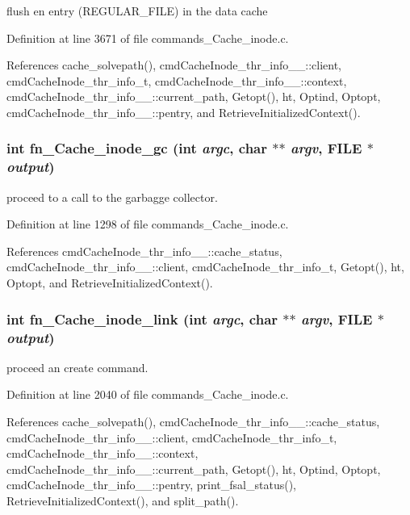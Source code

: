 flush en entry (REGULAR\_\-FILE) in the data cache 

Definition at line 3671 of file commands\_\-Cache\_\-inode.c.

References cache\_\-solvepath(), cmd\-Cache\-Inode\_\-thr\_\-info\_\-\_\-::client, cmd\-Cache\-Inode\_\-thr\_\-info\_\-t, cmd\-Cache\-Inode\_\-thr\_\-info\_\-\_\-::context, cmd\-Cache\-Inode\_\-thr\_\-info\_\-\_\-::current\_\-path, Getopt(), ht, Optind, Optopt, cmd\-Cache\-Inode\_\-thr\_\-info\_\-\_\-::pentry, and Retrieve\-Initialized\-Context().
\subsubsection{\setlength{\rightskip}{0pt plus 5cm}int fn\_\-Cache\_\-inode\_\-gc (int {\em argc}, char $\ast$$\ast$ {\em argv}, FILE $\ast$ {\em output})}\label{commands__Cache__inode_8c_a32}


proceed to a call to the garbagge collector. 

Definition at line 1298 of file commands\_\-Cache\_\-inode.c.

References cmd\-Cache\-Inode\_\-thr\_\-info\_\-\_\-::cache\_\-status, cmd\-Cache\-Inode\_\-thr\_\-info\_\-\_\-::client, cmd\-Cache\-Inode\_\-thr\_\-info\_\-t, Getopt(), ht, Optopt, and Retrieve\-Initialized\-Context().
\subsubsection{\setlength{\rightskip}{0pt plus 5cm}int fn\_\-Cache\_\-inode\_\-link (int {\em argc}, char $\ast$$\ast$ {\em argv}, FILE $\ast$ {\em output})}\label{commands__Cache__inode_8c_a36}


proceed an create command. 

Definition at line 2040 of file commands\_\-Cache\_\-inode.c.

References cache\_\-solvepath(), cmd\-Cache\-Inode\_\-thr\_\-info\_\-\_\-::cache\_\-status, cmd\-Cache\-Inode\_\-thr\_\-info\_\-\_\-::client, cmd\-Cache\-Inode\_\-thr\_\-info\_\-t, cmd\-Cache\-Inode\_\-thr\_\-info\_\-\_\-::context, cmd\-Cache\-Inode\_\-thr\_\-info\_\-\_\-::current\_\-path, Getopt(), ht, Optind, Optopt, cmd\-Cache\-Inode\_\-thr\_\-info\_\-\_\-::pentry, print\_\-fsal\_\-status(), Retrieve\-Initialized\-Context(), and split\_\-path().
